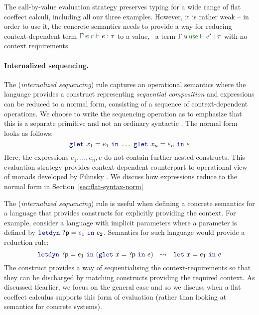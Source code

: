 The call-by-value evaluation strategy preserves typing for a wide range of flat coeffect calculi, 
including all our three examples. However, it is rather weak -- in order to use it, the concrete 
semantics needs to provide a way for reducing context-dependent term $\coctx{\Gamma}{\cclrd{r}} \vdash e : \tau$ 
to a value, \ie~a term $\coctx{\Gamma}{\cunit} \vdash e' : \tau$ with no context requirements. 

\paragraph{Internalized sequencing.}

The (\emph{internalized sequencing}) rule captures an operational semantics where the language
provides a construct representing \emph{sequential composition} and expressions can be reduced to 
a normal form, consisting of a sequence of context-dependent operations. We choose to write the 
sequencing operation as  to emphasize that this is a separate primitive and not an 
ordinary syntactic . The normal form looks as follows:
%
\begin{equation*}
\kvd{glet}~x_1 = e_1~\kvd{in}~\ldots~\kvd{glet}~x_n = e_n~\kvd{in}~e
\end{equation*}
%
Here, the expressions $e_1, \ldots, e_n, e$ do not contain further nested  constructs.
This evaluation strategy provides context-dependent counterpart to operational view of monads
developed by Filinsky \cite{monads-inaction}. We discuss how expressions reduce to the normal form
in Section~\ref{sec:flat-syntax-norm}

The (\emph{internalized sequencing}) rule is useful when defining a concrete semantics for 
a language that provides constructs for explicitly providing the context. For example, consider
a language with implicit parameters where a parameter is defined by $\kvd{letdyn}~\ident{?p}=e_1~\kvd{in}~e_2$.
Semantics for such language would provide a reduction rule:
%
\begin{equation*}
\kvd{letdyn}~\ident{?p}=e_1~\kvd{in}~(\kvd{glet}~x = \ident{?p}~\kvd{in}~e)
 ~~\leadsto~~ \kvd{let}~x = e_1~\kvd{in}~e
\end{equation*}
%
The  construct provides a way of sequentialising the context-require\-ments so
that they can be discharged by matching constructs providing the required context. As discussed
tfearlier, we focus on the general case and so we discuss when a flat coeffect calculus supports
this form of evaluation (rather than looking at semantics for concrete systems).

